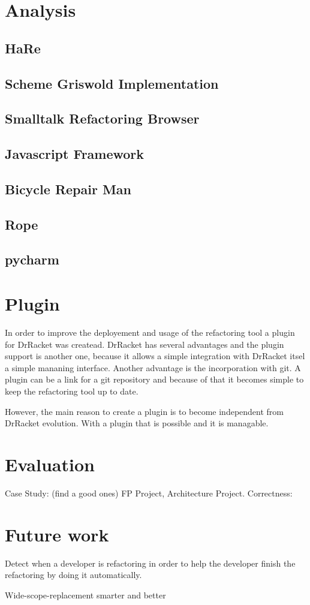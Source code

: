 \section{Analysis}
\subsection{HaRe}
\subsection{Scheme Griswold Implementation}
\subsection{Smalltalk Refactoring Browser}
\subsection{Javascript Framework}
\subsection{Bicycle Repair Man}
\subsection{Rope}
\subsection{pycharm}

\section{Plugin}
In order to improve the deployement and usage of the refactoring tool a plugin
for DrRacket was createad.
DrRacket has several advantages and the plugin support is another one, because
it allows a simple integration with DrRacket itsel a simple mananing interface.
Another advantage is the incorporation with git. A plugin can be a link for a git
repository and because of that it becomes simple to keep the refactoring tool up to date.

However, the main reason to create a plugin is to become independent from DrRacket
evolution. With a plugin that is possible and it is managable.

\section{Evaluation}
Case Study: (find a good ones) FP Project, Architecture Project.
Correctness:
\section{Future work}
Detect when a developer is refactoring in order to help the developer finish the
refactoring by doing it automatically.

Wide-scope-replacement smarter and better
